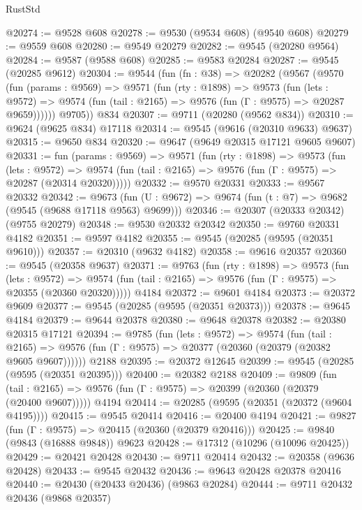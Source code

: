 \begin{lexlean}{RustStd}
\begin{coremodule}
@20274 := @9528 @608
@20278 := @9530 (@9534 @608) (@9540 @608)
@20279 := @9559 @608
@20280 := @9549 @20279
@20282 := @9545 (@20280 @9564)
@20284 := @9587 (@9588 @608)
@20285 := @9583 @20284
@20287 := @9545 (@20285 @9612)
@20304 := @9544
    (fun (fn : @38) =>
    @20282
      (@9567
        (@9570
          (fun (params : @9569) =>
          @9571
            (fun (rty : @1898) =>
            @9573
              (fun (lets : @9572) =>
              @9574 (fun (tail : @2165) => @9576 (fun (Γ : @9575) => @20287 @9659))))))
        @9705))
    @834
@20307 := @9711 (@20280 (@9562 @834))
@20310 := @9624 (@9625 @834) @17118
@20314 := @9545 (@9616 (@20310 @9633) @9637)
@20315 := @9650 @834
@20320 := @9647 (@9649 @20315 @17121 @9605 @9607)
@20331 := fun (params : @9569) =>
  @9571
    (fun (rty : @1898) =>
    @9573
      (fun (lets : @9572) =>
      @9574 (fun (tail : @2165) => @9576 (fun (Γ : @9575) => @20287 (@20314 @20320)))))
@20332 := @9570 @20331
@20333 := @9567 @20332
@20342 := @9673
    (fun (U : @9672) => @9674 (fun (t : @7) => @9682 (@9545 (@9688 @17118 @9563) @9699)))
@20346 := @20307 (@20333 @20342) (@9755 @20279)
@20348 := @9530 @20332 @20342
@20350 := @9760 @20331 @4182
@20351 := @9597 @4182
@20355 := @9545 (@20285 (@9595 (@20351 @9610)))
@20357 := @20310 (@9632 @4182)
@20358 := @9616 @20357
@20360 := @9545 (@20358 @9637)
@20371 := @9763
    (fun (rty : @1898) =>
    @9573
      (fun (lets : @9572) =>
      @9574 (fun (tail : @2165) => @9576 (fun (Γ : @9575) => @20355 (@20360 @20320)))))
    @4184
@20372 := @9601 @4184
@20373 := @20372 @9609
@20377 := @9545 (@20285 (@9595 (@20351 @20373)))
@20378 := @9645 @4184
@20379 := @9644 @20378
@20380 := @9648 @20378
@20382 := @20380 @20315 @17121
@20394 := @9785
    (fun (lets : @9572) =>
    @9574
      (fun (tail : @2165) =>
      @9576 (fun (Γ : @9575) => @20377 (@20360 (@20379 (@20382 @9605 @9607))))))
    @2188
@20395 := @20372 @12645
@20399 := @9545 (@20285 (@9595 (@20351 @20395)))
@20400 := @20382 @2188
@20409 := @9809
    (fun (tail : @2165) => @9576 (fun (Γ : @9575) => @20399 (@20360 (@20379 (@20400 @9607)))))
    @4194
@20414 := @20285 (@9595 (@20351 (@20372 (@9604 @4195))))
@20415 := @9545 @20414
@20416 := @20400 @4194
@20421 := @9827 (fun (Γ : @9575) => @20415 (@20360 (@20379 @20416)))
@20425 := @9840 (@9843 (@16888 @9848)) @9623
@20428 := @17312 (@10296 (@10096 @20425))
@20429 := @20421 @20428
@20430 := @9711 @20414
@20432 := @20358 (@9636 @20428)
@20433 := @9545 @20432
@20436 := @9643 @20428 @20378 @20416
@20440 := @20430 (@20433 @20436) (@9863 @20284)
@20444 := @9711 @20432 @20436 (@9868 @20357)

\end{coremodule}
\end{lexlean}
